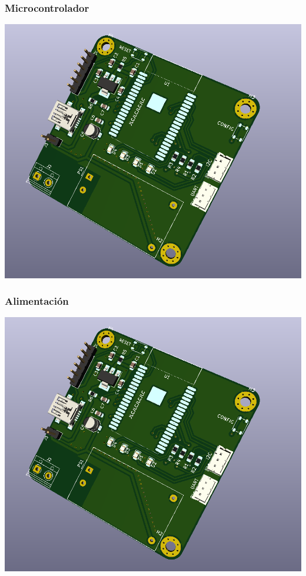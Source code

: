 \documentclass[a4paper ,12pt, onecolumn]{article}
\begin{document}
        \subsubsection{Microcontrolador} 
            \includegraphics[scale=0.4]{../receiver_1.PNG}
        \subsubsection{Alimentación} 
            \includegraphics[scale=0.4]{../receiver_1.PNG}
\end{document}
